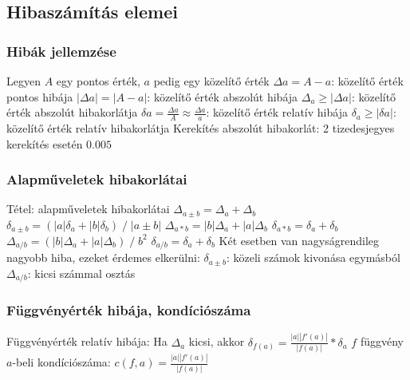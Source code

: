 \documentclass[12pt,a4paper]{article}
\begin{document}
\pagebreak

\subsection{Hibaszámítás elemei}

\subsubsection{Hibák jellemzése}

\begin{outline}
	\1 Legyen $A$ egy pontos érték, $a$ pedig egy közelítő érték
	\1 $\Delta a = A - a$: közelítő érték pontos hibája
	\1 $|\Delta a| = |A - a|$: közelítő érték abszolút hibája
	\1 $\Delta_a \ge |\Delta a|$: közelítő érték abszolút hibakorlátja
	\1 $\delta a = \frac{\Delta a}{A} \approx \frac{\Delta a}{a}$: közelítő érték relatív hibája
	\1 $\delta_a \ge |\delta a|$: közelítő érték relatív hibakorlátja
	\1 Kerekítés abszolút hibakorlát: 2 tizedesjegyes kerekítés esetén $0.005$
\end{outline}

\subsubsection{Alapműveletek hibakorlátai}

\begin{outline}
	\1 Tétel: alapműveletek hibakorlátai
		\2 $\Delta_{a \pm b} = \Delta_a + \Delta_b$ \;\;\;\;\;\;\;\;\;\;\;\;\;\;\;\;\;\;\;\;
		$\delta_{a \pm b} = (|a|\delta_a+|b|\delta_b) \;/\; |a \pm b|$
		\2 $\Delta_{a * b} = |b|\Delta_a + |a|\Delta_b$ \;\;\;\;\;\;\;\;\;\;\;\;\;\;
		$\delta_{a * b} = \delta_a + \delta_b$
		\2 $\Delta_{a / b} = (|b|\Delta_a + |a|\Delta_b) \;/\; b^2$ \;\;\;\;\;
		$\delta_{a / b} = \delta_a + \delta_b$
	\1 Két esetben van nagyságrendileg nagyobb hiba, ezeket érdemes elkerülni:
		\2 $\delta_{a \pm b}$: közeli számok kivonása egymásból
		\2 $\Delta_{a/b}$: kicsi számmal osztás
\end{outline}

\subsubsection{Függvényérték hibája, kondíciószáma}

\begin{outline}
	\1 Függvényérték relatív hibája: Ha $\Delta_a$ kicsi, akkor $\delta_{f(a)} = \frac{|a||f'(a)|}{|f(a)|}*\delta_a$
	\1 $f$ függvény $a$-beli kondíciószáma: $c(f,a)=\frac{|a||f'(a)|}{|f(a)|}$
\end{outline}
\end{document}
